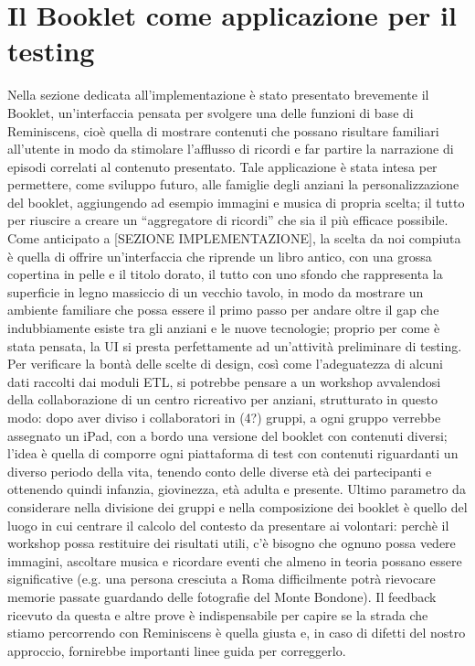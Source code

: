 \documentclass{acm_proc_article-sp}
\begin{document}
\section{Il Booklet come applicazione per il testing}
Nella sezione dedicata all’implementazione è stato presentato brevemente il Booklet, un’interfaccia pensata per svolgere una delle funzioni di base di Reminiscens, cioè quella di mostrare contenuti che possano risultare familiari all’utente in modo da stimolare l’afflusso di ricordi e far partire la narrazione di episodi correlati al contenuto presentato. Tale applicazione è stata intesa per permettere, come sviluppo futuro, alle famiglie degli anziani la personalizzazione del booklet, aggiungendo ad esempio immagini e musica di propria scelta; il tutto per riuscire a creare un “aggregatore di ricordi” che sia il più efficace possibile. Come anticipato a [SEZIONE IMPLEMENTAZIONE], la scelta da noi compiuta è quella di offrire un’interfaccia che riprende un libro antico, con una grossa copertina in pelle e il titolo dorato, il tutto con uno sfondo che rappresenta la superficie in legno massiccio di un vecchio tavolo, in modo da mostrare un ambiente familiare che possa essere il primo passo per andare oltre il gap che indubbiamente esiste tra gli anziani e le nuove tecnologie; proprio per come è stata pensata, la UI si presta perfettamente ad un’attività preliminare di testing. Per verificare la bontà delle scelte di design, così come l’adeguatezza di alcuni dati raccolti dai moduli ETL, si potrebbe pensare a un workshop avvalendosi della collaborazione di un centro ricreativo per anziani, strutturato in questo modo: dopo aver diviso i collaboratori in (4?) gruppi, a ogni gruppo verrebbe assegnato un iPad, con a bordo una versione del booklet con contenuti diversi; l’idea è quella di comporre ogni piattaforma di test con contenuti riguardanti un diverso periodo della vita, tenendo conto delle diverse età dei partecipanti e ottenendo quindi infanzia, giovinezza, età adulta e presente. Ultimo parametro da considerare nella divisione dei gruppi e nella composizione dei booklet è quello del luogo in cui centrare il calcolo del contesto da presentare ai volontari: perchè il workshop possa restituire dei risultati utili, c’è bisogno che ognuno possa vedere immagini, ascoltare musica e ricordare eventi che almeno in teoria possano essere significative (e.g. una persona cresciuta a Roma difficilmente potrà rievocare memorie passate guardando delle fotografie del Monte Bondone). Il feedback ricevuto da questa e altre prove è indispensabile per capire se la strada che stiamo percorrendo con Reminiscens è quella giusta e, in caso di difetti del nostro approccio, fornirebbe importanti linee guida per correggerlo.
\end{document}

